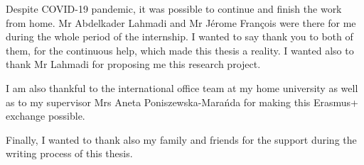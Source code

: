 Despite COVID-19 pandemic, it was possible to continue and finish the work from home. Mr Abdelkader Lahmadi and Mr Jérome François were there for me during the whole period of the internship. I wanted to say thank you to both of them, for the continuous help, which made this thesis a reality. I wanted also to thank Mr Lahmadi for proposing me this research project.

I am also thankful to the international office team at my home university as well as to my supervisor Mrs Aneta Poniszewska-Marańda for making this Erasmus+ exchange possible.

Finally, I wanted to thank also my family and friends for the support during the writing process of this thesis.
